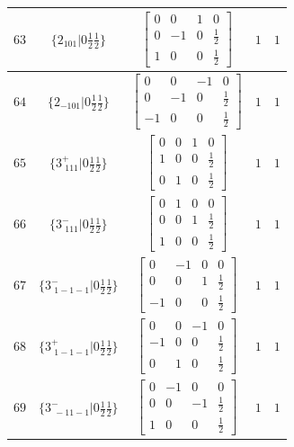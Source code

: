 \documentclass[fleqn,8pt]{jsarticle}
\begin{document}
\begin{longtable}{ccccc}
$ 63 $ & $ \{2{}_{101}|0 \frac{1}{2} \frac{1}{2}\} $ & $ \begin{bmatrix} 0 & 0 & 1 & 0 \\ 0 & -1 & 0 & \frac{1}{2} \\ 1 & 0 & 0 & \frac{1}{2} \end{bmatrix} $ & $ 1 $ & $ 1 $ \\ \hline
$ 64 $ & $ \{2{}_{-101}|0 \frac{1}{2} \frac{1}{2}\} $ & $ \begin{bmatrix} 0 & 0 & -1 & 0 \\ 0 & -1 & 0 & \frac{1}{2} \\ -1 & 0 & 0 & \frac{1}{2} \end{bmatrix} $ & $ 1 $ & $ 1 $ \\ \hline
$ 65 $ & $ \{3^{+}_{\,\,111}|0 \frac{1}{2} \frac{1}{2}\} $ & $ \begin{bmatrix} 0 & 0 & 1 & 0 \\ 1 & 0 & 0 & \frac{1}{2} \\ 0 & 1 & 0 & \frac{1}{2} \end{bmatrix} $ & $ 1 $ & $ 1 $ \\ \hline
$ 66 $ & $ \{3^{-}_{\,\,111}|0 \frac{1}{2} \frac{1}{2}\} $ & $ \begin{bmatrix} 0 & 1 & 0 & 0 \\ 0 & 0 & 1 & \frac{1}{2} \\ 1 & 0 & 0 & \frac{1}{2} \end{bmatrix} $ & $ 1 $ & $ 1 $ \\ \hline
$ 67 $ & $ \{3^{-}_{\,\,1-1-1}|0 \frac{1}{2} \frac{1}{2}\} $ & $ \begin{bmatrix} 0 & -1 & 0 & 0 \\ 0 & 0 & 1 & \frac{1}{2} \\ -1 & 0 & 0 & \frac{1}{2} \end{bmatrix} $ & $ 1 $ & $ 1 $ \\ \hline
$ 68 $ & $ \{3^{+}_{\,\,1-1-1}|0 \frac{1}{2} \frac{1}{2}\} $ & $ \begin{bmatrix} 0 & 0 & -1 & 0 \\ -1 & 0 & 0 & \frac{1}{2} \\ 0 & 1 & 0 & \frac{1}{2} \end{bmatrix} $ & $ 1 $ & $ 1 $ \\ \hline
$ 69 $ & $ \{3^{-}_{\,\,-11-1}|0 \frac{1}{2} \frac{1}{2}\} $ & $ \begin{bmatrix} 0 & -1 & 0 & 0 \\ 0 & 0 & -1 & \frac{1}{2} \\ 1 & 0 & 0 & \frac{1}{2} \end{bmatrix} $ & $ 1 $ & $ 1 $ \\ \hline

\end{longtable}
\end{document}
